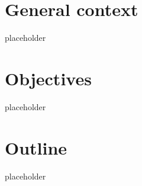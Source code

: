 \section*{General context}
placeholder
\section*{Objectives}
placeholder
\section*{Outline}
placeholder